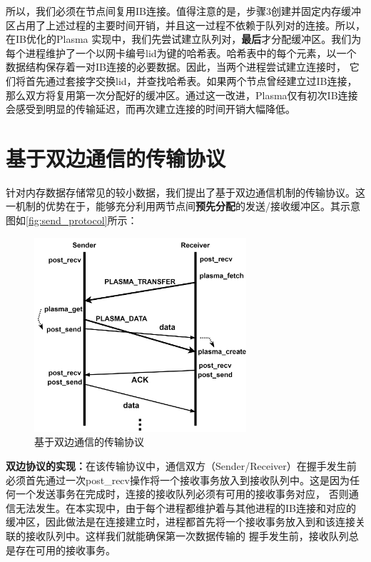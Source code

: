 所以，我们必须在节点间复用IB连接。值得注意的是，步骤3创建并固定内存缓冲区占用了上述过程的主要时间开销，并且这一过程不依赖于队列对的连接。所以，在IB优化的Plasma
实现中，我们先尝试建立队列对，\textbf{最后}才分配缓冲区。我们为每个进程维护了一个以网卡编号lid为键的哈希表。哈希表中的每个元素，以一个数据结构保存着一对IB连接的必要数据。因此，当两个进程尝试建立连接时，
它们将首先通过套接字交换lid，并查找哈希表。如果两个节点曾经建立过IB连接，那么双方将复用第一次分配好的缓冲区。通过这一改进，Plasma仅有初次IB连接会感受到明显的传输延迟，而再次建立连接的时间开销大幅降低。

\section{基于双边通信的传输协议}
\label{sec:send}

针对内存数据存储常见的较小数据，我们提出了基于双边通信机制的传输协议。这一机制的优势在于，能够充分利用两节点间\textbf{预先分配}的发送/接收缓冲区。其示意图如\autoref{fig:send_protocol}所示：

\begin{figure}[h]
	\centering
	\includegraphics[width=0.7\textwidth]{image/chap03/send_protocol.png}
	\caption{基于双边通信的传输协议}
	\label{fig:send_protocol}
\end{figure}

\textbf{双边协议的实现：}在该传输协议中，通信双方（Sender/Receiver）在握手发生前必须首先通过一次post\_recv操作将一个接收事务放入到接收队列中。这是因为任何一个发送事务在完成时，连接的接收队列必须有可用的接收事务对应，
否则通信无法发生。在本实现中，由于每个进程都维护着与其他进程的IB连接和对应的缓冲区，因此做法是在连接建立时，进程都首先将一个接收事务放入到和该连接关联的接收队列中。这样我们就能确保第一次数据传输的
握手发生前，接收队列总是存在可用的接收事务。

